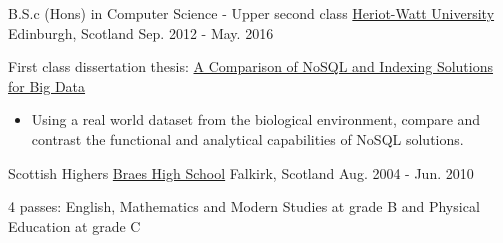 \begin{cventries}
  \cventry
    {B.S.c (Hons) in Computer Science - Upper second class}
    {\href{https://www.hw.ac.uk/}{Heriot-Watt University}}
    {Edinburgh, Scotland}
    {Sep. 2012 - May. 2016}
    {
      \begin{cvitems}
        \item {First class dissertation thesis: \href{https://www.dropbox.com/s/okwwbflv75s6xvo/CallumGuthrieDissertation.pdf?dl=0}{A Comparison of NoSQL and Indexing Solutions for Big Data}}
        \vspace{1mm}
          \begin{itemize}
            \item Using a real world dataset from the biological environment, compare and contrast the functional and analytical capabilities of NoSQL solutions.
          \end{itemize}
      \end{cvitems}
    }
    \cventry
    {Scottish Highers}
    {\href{http://www.braes.falkirk.sch.uk/}{Braes High School}}
    {Falkirk, Scotland}
    {Aug. 2004 - Jun. 2010}
    {
      \begin{cvitems}
        \item {4 passes: English, Mathematics and Modern Studies at grade B and Physical Education at grade C}
      \end{cvitems}
    }
\end{cventries}